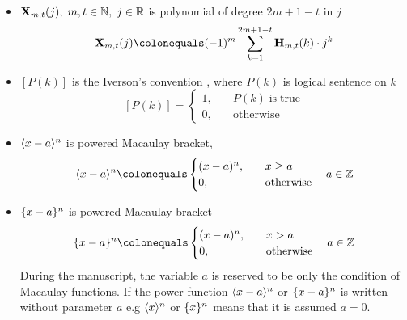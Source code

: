 \documentclass[12pt,letterpaper,oneside,reqno]{amsart}
\newcommand \anglePower [2]{\langle #1 \rangle \sp{#2}}
\newcommand \curvePower [2]{\{#1\}\sp{#2}}
\newcommand \coeffH [4][H] {{\mathbf{#1}} \sb{#2,#3} (#4)}
\newcommand \polynomialX [4][X] {{\mathbf{#1}}\sb{#2,#3} (#4)}
\numberwithin{equation}{section}
\begin{document}
\begin{itemize}
        \item $\polynomialX{m}{t}{j}, \; m,t\in\mathbb{N}, \; j\in\mathbb{R}$ is polynomial of degree $2m+1-t$ in $j$
        \begin{equation*}
            \label{def_coeff_x}
            \polynomialX{m}{t}{j} \colonequals (-1)^m \sum_{k=1}^{2m+1-t} \coeffH{m}{t}{k} \cdot j^k
        \end{equation*}
        \item $[P(k)]$ is the Iverson's convention \cite{APL}, where $P(k)$ is logical sentence on $k$
        \begin{equation}
            \label{def_iverson}
            [P(k)] =
            \begin{cases}
                1, & \quad P(k) \; \mathrm{is} \; \mathrm{true} \\
                0, & \quad \mathrm{otherwise}
            \end{cases}
        \end{equation}
        \item $\anglePower{x-a}{n}$ is powered Macaulay bracket, \cite{Mac19}
        \begin{equation}
            \label{def_macaulay_bracket}
            \anglePower{x-a}{n} \colonequals
            \begin{cases}
                (x-a)^n, &\quad x\geq a \\
                0, &\quad \mathrm{otherwise}
            \end{cases} \quad a\in\mathbb{Z}
        \end{equation}
        \item $\curvePower{x-a}{n}$ is powered Macaulay bracket
        \begin{equation}
            \label{def_macaulay_bracket_strict}
            \curvePower{x-a}{n} \colonequals
            \begin{cases}
                (x-a)^n, &\quad x>a \\
                0, &\quad \mathrm{otherwise}
            \end{cases}  \quad a\in\mathbb{Z}
        \end{equation}
        During the manuscript, the variable $a$ is reserved to be only the condition of Macaulay functions.
        If the power function $\anglePower{x-a}{n}$ or $\curvePower{x-a}{n}$ is written without parameter $a$
        e.g $\anglePower{x}{n}$ or $\curvePower{x}{n}$ means that it is assumed $a=0$.
    \end{itemize}
\end{document}
